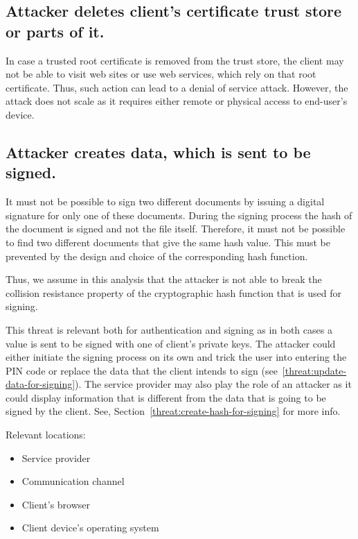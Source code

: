 \subsection{Attacker deletes client's certificate trust store or parts of it.}
\label{threat:delete-trust-store}
In case a trusted root certificate is removed from the trust store, the client may not be able to visit web sites or use web services, which rely on that root certificate. Thus, such action can lead to a denial of service attack. However, the attack does not scale as it requires either remote or physical access to end-user's device.





\subsection{Attacker creates data, which is sent to be signed.}
\label{threat:create-data-for-signing}
It must not be possible to sign two different documents by issuing a digital signature for only one of these documents. During the signing process the hash of the document is signed and not the file itself. Therefore, it must not be possible to find two different documents that give the same hash value. This must be prevented by the design and choice of the corresponding hash function. 

Thus, we assume in this analysis that the attacker is not able to break the collision resistance property of the cryptographic hash function that is used for signing.

This threat is relevant both for authentication and signing as in both cases a value is sent to be signed with one of client's private keys. The attacker could either initiate the signing process on its own and trick the user into entering the PIN code or replace the data that the client intends to sign (see~\ref{threat:update-data-for-signing}). The service provider may also play the role of an attacker as it could display information that is different from the data that is going to be signed by the client. See, Section~\ref{threat:create-hash-for-signing} for more info.

Relevant locations: 
\begin{itemize}
\item Service provider
\item Communication channel
\item Client's browser
\item Client device's operating system
\end{itemize}

